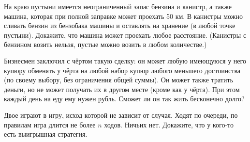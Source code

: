 \documentclass[12pt,a4paper]{article}
\begin{document}
 На краю пустыни имеется неограниченный запас бензина и канистр, а также машина, которая при полной заправке может проехать 50 км. В канистры можно сливать бензин из бензобака машины и оставлять на хранение (в любой точке пустыни). Докажите, что машина может проехать любое расстояние. (Канистры с бензином возить нельзя, пустые можно возить в любом количестве.)

 Бизнесмен заключил с чёртом такую сделку: он может любую имеющуюся у него купюру обменять у чёрта на любой набор купюр любого меньшего достоинства (по своему выбору, без ограничения общей суммы). Он может также тратить деньги, но не может получать их в другом месте (кроме как у чёрта). При этом каждый день на еду ему нужен рубль. Сможет ли он так жить бесконечно долго?


Двое играют в игру, исход которой не зависит от случая. %
Ходят по
очереди, по правилам игра длится не более $n$ ходов. Ничьих
нет. Докажите, что у кого-то есть выигрышная стратегия.


\end{document}
